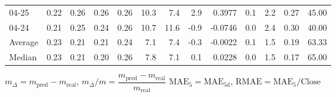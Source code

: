 \begin{threeparttable}
{\begin{tabular}{lrrrrrrrrrrrr}
  04-25 &          0.22 &          0.26 &          0.26 &        0.26 &                10.3 &                 7.4 &        2.9 &       0.3977 &                 0.1 &              2.2 &            0.27 &                  45.00 \\
  04-24 &          0.21 &          0.25 &          0.24 &        0.26 &                10.7 &                11.6 &       -0.9 &      -0.0746 &                 0.0 &              2.4 &            0.30 &                  40.00 \\
Average &          0.23 &          0.21 &          0.21 &        0.24 &                 7.1 &                 7.4 &       -0.3 &      -0.0022 &                 0.1 &              1.5 &            0.19 &                  63.33 \\
 Median &          0.23 &          0.21 &          0.20 &        0.26 &                 7.8 &                 7.1 &        0.1 &       0.0228 &                 0.0 &              1.5 &            0.17 &                  65.00 \\
\bottomrule
\end{tabular}
}
\begin{tablenotes}\footnotesize
\item $m_\Delta=m_{\text{pred}}-m_{\text{real}}$,
$m_\Delta/m=\dfrac{m_{\text{pred}}-m_{\text{real}}}{m_{\text{real}}}$
$\mathrm{MAE}_5=\mathrm{MAE}_{5\text{d}}$,
$\mathrm{RMAE}=\mathrm{MAE}_5/\text{Close}$
\end{tablenotes}
\end{threeparttable}
\endgroup

